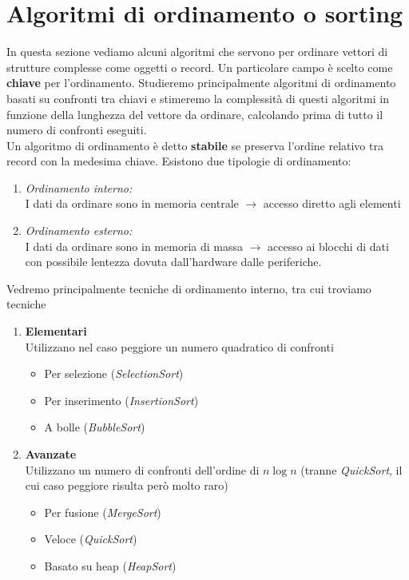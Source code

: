 \section{Algoritmi di ordinamento o sorting}

In questa sezione vediamo alcuni algoritmi che servono per ordinare
vettori di strutture complesse come oggetti o record. Un particolare campo
è scelto come {\textbf{chiave}} per l'ordinamento.
Studieremo principalmente algoritmi di ordinamento basati su confronti
tra chiavi e stimeremo la complessità di questi algoritmi in funzione della 
lunghezza del vettore da ordinare, calcolando prima di tutto il numero di confronti eseguiti.\\
Un algoritmo di ordinamento è detto {\textbf{stabile}} se preserva l'ordine 
relativo tra record con la medesima chiave.
Esistono due tipologie di ordinamento:
\begin{enumerate}
    \item {\emph{Ordinamento interno:}}\\
    I dati da ordinare sono in memoria centrale $\rightarrow$ accesso diretto agli elementi

    \item {\emph{Ordinamento esterno:}}\\
    I dati da ordinare sono in memoria di massa $\rightarrow$ accesso ai blocchi
    di dati con possibile lentezza dovuta dall'hardware dalle periferiche.

\end{enumerate}

\noindent Vedremo principalmente tecniche di ordinamento interno, tra cui troviamo tecniche
\begin{enumerate}
    \item {\textbf{Elementari}}\\
    Utilizzano nel caso peggiore un numero quadratico di confronti
    \begin{itemize}
        \item Per selezione ({\emph{SelectionSort}})
        \item Per inserimento ({\emph{InsertionSort}})
        \item A bolle ({\emph{BubbleSort}})
    \end{itemize}

    \item {\textbf{Avanzate}}\\
    Utilizzano un numero di confronti dell'ordine di $n \log n$ (tranne {\emph{QuickSort}}, il cui
    caso peggiore risulta però molto raro)
    \begin{itemize}
        \item Per fusione ({\emph{MergeSort}})
        \item Veloce ({\emph{QuickSort}})
        \item Basato su heap ({\emph{HeapSort}})
    \end{itemize}
\end{enumerate}
\clearpage


